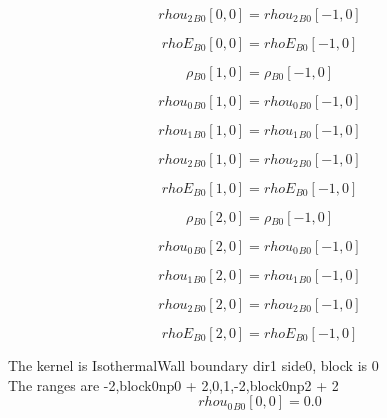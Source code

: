 \documentclass{article}
\begin{document}
\begin{dmath}{rhou_{2}{_{B0}}}[{0,0}] = {rhou_{2}{_{B0}}}[{-1,0}]\end{dmath}

\begin{dmath}{rhoE{_{B0}}}[{0,0}] = {rhoE{_{B0}}}[{-1,0}]\end{dmath}

\begin{dmath}{\rho{_{B0}}}[{1,0}] = {\rho{_{B0}}}[{-1,0}]\end{dmath}

\begin{dmath}{rhou_{0}{_{B0}}}[{1,0}] = {rhou_{0}{_{B0}}}[{-1,0}]\end{dmath}

\begin{dmath}{rhou_{1}{_{B0}}}[{1,0}] = {rhou_{1}{_{B0}}}[{-1,0}]\end{dmath}

\begin{dmath}{rhou_{2}{_{B0}}}[{1,0}] = {rhou_{2}{_{B0}}}[{-1,0}]\end{dmath}

\begin{dmath}{rhoE{_{B0}}}[{1,0}] = {rhoE{_{B0}}}[{-1,0}]\end{dmath}

\begin{dmath}{\rho{_{B0}}}[{2,0}] = {\rho{_{B0}}}[{-1,0}]\end{dmath}

\begin{dmath}{rhou_{0}{_{B0}}}[{2,0}] = {rhou_{0}{_{B0}}}[{-1,0}]\end{dmath}

\begin{dmath}{rhou_{1}{_{B0}}}[{2,0}] = {rhou_{1}{_{B0}}}[{-1,0}]\end{dmath}

\begin{dmath}{rhou_{2}{_{B0}}}[{2,0}] = {rhou_{2}{_{B0}}}[{-1,0}]\end{dmath}

\begin{dmath}{rhoE{_{B0}}}[{2,0}] = {rhoE{_{B0}}}[{-1,0}]\end{dmath}

\noindent The kernel is IsothermalWall boundary dir1 side0, block is 0\\\noindent The ranges are -2,block0np0 + 2,0,1,-2,block0np2 + 2\\\begin{dmath}{rhou_{0}{_{B0}}}[{0,0}] = 0.0\end{dmath}
\end{document}
